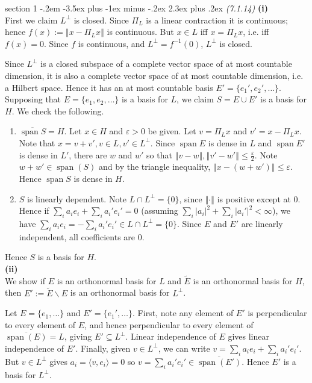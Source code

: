 \documentclass[12pt]{article}
\makeatletter
\theoremstyle{norm}
\newcommand{\subeq}[0]{\subseteq}
\newcommand{\ep}[0]{\varepsilon}
\newcommand{\eph}[0]{\frac{\varepsilon}{2}}
\newcommand{\an}[1]{\langle {#1}\rangle}
\newcommand{\ve}[1]{\left\Vert {#1}\right\Vert}
\newcommand{\subprob}[1]{\noindent\textbf{#1}\\}
\newcommand{\spn}{\operatorname{span}}
\newcommand{\bs}[0]{\backslash}
\newcommand{\ol}[1]{\overline{#1}}
\newcommand{\iy}[0]{\infty}
\newenvironment{problem}{\@startsection
       {section}
       {1}
       {-.2em}
       {-3.5ex plus -1ex minus -.2ex}
       {2.3ex plus .2ex}
       {\pagebreak[3]%
       \large\bf\noindent{Problem }
       }
       }
       {%
       }
\makeatother
\begin{document}
\begin{problem}{\it(7.1.14)}
\subprob{(i)}
First we claim $L^{\perp}$ is closed. Since $\Pi_L$ is a linear contraction it is continuous; hence $f(x):=\ve{x-\Pi_L x}$ is continuous. But $x\in L$ iff $x=\Pi_Lx$, i.e. iff $f(x)=0$. Since $f$ is continuous, and $L^{\perp}=f^{-1}(0)$, $L^{\perp}$ is closed.

Since $L^{\perp}$ is a closed subspace of a complete vector space of at most countable dimension, it is also a complete vector space of at most countable dimension, i.e. a Hilbert space. Hence it has an at most countable basis $E'=\{e_1',e_2',\ldots\}$. Supposing that $E=\{e_1,e_2,\ldots\}$ is a basis for $L$, we claim $S=E\cup E'$ is a basis for $H$. We check the following.
\begin{enumerate}
\item $\ol{\spn S}=H$. Let $x\in H$ and $\ep>0$ be given. Let $v=\Pi_L x$ and $v'=x-\Pi_L x$. Note that $x=v+v', v\in L,v'\in L^{\perp}$. Since $\spn E$ is dense in $L$ and $\spn E'$ is dense in $L'$, there are $w$ and $w'$ so that $\ve{v-w},\ve{v'-w'}\le \eph$. Note $w+w'\in \spn(S)$ and by the triangle inequality, $\ve{x-(w+w')}\le\ep$. Hence $\spn S$ is dense in $H$.
\item $S$ is linearly dependent. Note $L\cap L^{\perp}=\{0\}$, since $\ve{\cdot}$ is positive except at 0. Hence if $\sum_i a_ie_i+\sum_ia_i'e_i'=0$ (assuming $\sum_i|a_i|^2+\sum_i|a_i'|^2<\iy$), we have $\sum_i a_ie_i=-\sum_ia_i'e_i'\in L\cap L^{\perp}=\{0\}$. Since $E$ and $E'$ are linearly independent, all coefficients are 0.
\end{enumerate}
Hence $S$ is a basis for $H$.\\

\subprob{(ii)}
We show if $E$ is an orthonormal basis for $L$ and $\tilde E$ is an orthonormal basis for $H$, then $E':=\tilde E\bs E$ is an orthonormal basis for $L^{\perp}$.

Let $E=\{e_1,\ldots\}$ and $E'=\{e_1',\ldots\}$. First, note any element of $E'$ is perpendicular to every element of $E$, and hence perpendicular to every element of $\ol{\spn(E)}=L$, giving $E'\subeq L^{\perp}$. Linear independence of $E$ gives linear independence of $E'$. Finally, given $v\in L^{\perp}$, we can write $v=\sum_i a_ie_i+\sum_ia_i'e_i'$. But $v\in L^{\perp}$ gives $a_i=\an{v,e_i}=0$ so $v=\sum_i a_i'e_i'\in \ol{\spn(E')}$. Hence $E'$ is a basis for $L^{\perp}$.
\end{problem}
\end{document}
